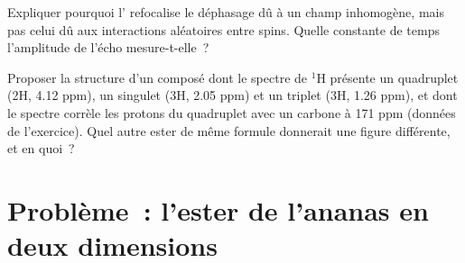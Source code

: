 \begin{exercise}[$\star\star\star$]\label{exo:b3:advanced-nmr:11}
Expliquer pourquoi l' refocalise le déphasage dû à un champ
inhomogène, mais pas celui dû aux interactions aléatoires entre spins.
Quelle constante de temps l'amplitude de l'écho mesure-t-elle~?
\end{exercise}

\begin{exercise}[$\star\star\star$]\label{exo:b3:advanced-nmr:12}
Proposer la structure d'un composé  dont le spectre de
${}^1$H présente un
quadruplet (2H, 4.12 ppm), un singulet (3H, 2.05 ppm) et un triplet (3H,
1.26 ppm), et dont le spectre  corrèle les protons du quadruplet
avec un carbone à 171 ppm (données de l'exercice). Quel autre ester de
même formule donnerait une figure  différente, et en quoi~?
\end{exercise}

\section{Problème~: l'ester de l'ananas en deux dimensions}

